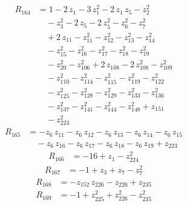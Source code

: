 \begin{equation*}\begin{aligned}
R_{164}&=1 -2\,z_{1} -3\,z_{1}^{2} -2\,z_{1}\,z_{5} -z_{2}^{2} \\
&\quad -z_{3}^{2} -2\,z_{5} -2\,z_{5}^{2} -z_{6}^{2} -z_{7}^{2} \\
&\quad +2\,z_{11} -z_{11}^{2} -z_{12}^{2} -z_{13}^{2} -z_{14}^{2} \\
&\quad -z_{15}^{2} -z_{16}^{2} -z_{17}^{2} -z_{18}^{2} -z_{19}^{2} \\
&\quad -z_{20}^{2} -z_{106}^{2} +2\,z_{108} -2\,z_{108}^{2} -z_{109}^{2} \\
&\quad -z_{110}^{2} -z_{114}^{2} -z_{115}^{2} -z_{119}^{2} -z_{122}^{2} \\
&\quad -z_{125}^{2} -z_{128}^{2} -z_{129}^{2} -z_{133}^{2} -z_{136}^{2} \\
&\quad -z_{137}^{2} -z_{141}^{2} -z_{144}^{2} -z_{148}^{2} +z_{151} \\
&\quad -z_{223}^{2}
\end{aligned}\end{equation*}
\begin{equation*}\begin{aligned}
R_{165}&=-z_{6}\,z_{11} -z_{6}\,z_{12} -z_{6}\,z_{13} -z_{6}\,z_{14} -z_{6}\,z_{15} \\
&\quad -z_{6}\,z_{16} -z_{6}\,z_{17} -z_{6}\,z_{18} -z_{6}\,z_{19} +z_{223}
\end{aligned}\end{equation*}
\begin{equation*}\begin{aligned}
R_{166}&=-16 +z_{1} -z_{224}^{2}
\end{aligned}\end{equation*}
\begin{equation*}\begin{aligned}
R_{167}&=-1 +z_{3} +z_{7} -z_{7}^{2}
\end{aligned}\end{equation*}
\begin{equation*}\begin{aligned}
R_{168}&=-z_{152}\,z_{226} -z_{226} +z_{235}
\end{aligned}\end{equation*}
\begin{equation*}\begin{aligned}
R_{169}&=-1 +z_{225}^{2} +z_{226}^{2} -z_{235}^{2}
\end{aligned}\end{equation*}
